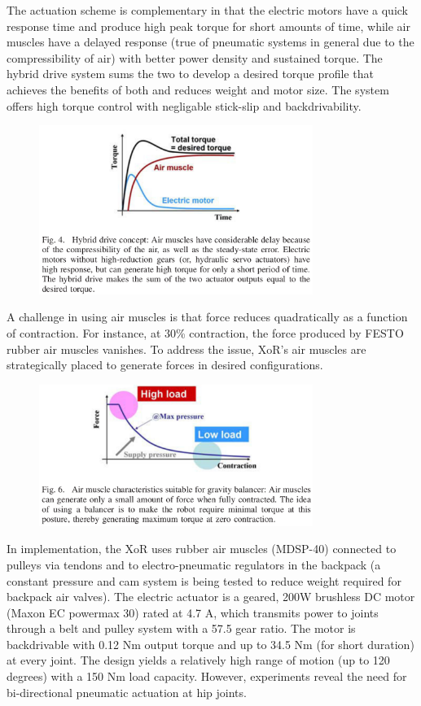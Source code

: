 \begin{refsection}
The actuation scheme is complementary in that the electric motors have a quick response time and produce high peak torque for short amounts of time, while air muscles have a delayed response (true of pneumatic systems in general due to the compressibility of air) with better power density and sustained torque.  The hybrid drive system sums the two to develop a desired torque profile that achieves the benefits of both and reduces weight and motor size.  The system offers high torque control with negligable stick-slip and backdrivability.

\begin{figure}[ht]
  \centering
  \includegraphics[width=3.5in]{exos/figs/xor_hybrid_drive_torque_time.png}
\end{figure}  

A challenge in using air muscles is that force reduces quadratically as a function of contraction.  For instance, at 30\% contraction, the force produced by FESTO rubber air muscles vanishes.  To address the issue, XoR's air muscles are strategically placed to generate forces in desired configurations.  

\begin{figure}[ht]
  \centering
  \includegraphics[width=3.5in]{exos/figs/xor_air_muscle_force_vs_contraction.png}
\end{figure}

In implementation, the XoR uses rubber air muscles (MDSP-40) connected to pulleys via tendons and to electro-pneumatic regulators in the backpack (a constant pressure and cam system is being tested to reduce weight required for backpack air valves).  The electric actuator is a geared, 200W brushless DC motor (Maxon EC powermax 30) rated at 4.7 A, which transmits power to joints through a belt and pulley system with a 57.5 gear ratio. The motor is backdrivable with 0.12 Nm output torque and up to 34.5 Nm (for short duration) at every joint.  The design yields a relatively high range of motion (up to 120 degrees) with a 150 Nm load capacity.  However, experiments reveal the need for bi-directional pneumatic actuation at hip joints.


\end{refsection}
